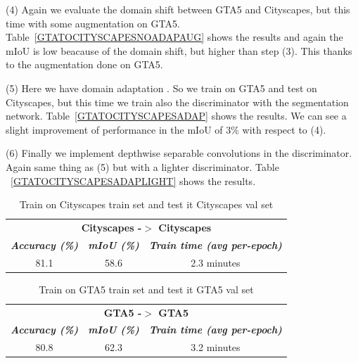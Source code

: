 \documentclass[conference]{IEEEtran}
\begin{document}
(4) Again we evaluate the domain shift between GTA5 and Cityscapes, but this time with some augmentation on GTA5. Table~\ref{GTATOCITYSCAPESNOADAPAUG}
shows the results and again the mIoU is low beacause of the domain shift, but higher than step (3). This thanks to the augmentation 
done on GTA5.

(5) Here we have domain adaptation \cite{b3}. So we train on GTA5 and test on Cityscapes, but this time we train also the discriminator
with the segmentation network. Table~\ref{GTATOCITYSCAPESADAP} shows the results. We can see a slight improvement of performance
in the mIoU of 3\% with respect to (4).

(6) Finally we implement depthwise separable convolutions in the discriminator. Again same thing as (5) but with a lighter discriminator. Table
~\ref{GTATOCITYSCAPESADAPLIGHT} shows the results. 



\begin{table}[tb]
\caption{Train on Cityscapes train set and test it Cityscapes val set}
\begin{center}
\begin{tabular}{|c|c|c|}
\hline
\multicolumn{3}{|c|}{\textbf{Cityscapes -$>$ Cityscapes}} \\
\cline{1-3} 
\textbf{\textit{Accuracy (\%)}}& \textbf{\textit{mIoU (\%)}}& \textbf{\textit{Train time (avg per-epoch)}} \\
\hline
81.1& 58.6& 2.3 minutes   \\
\hline
\end{tabular}
\label{CityscapesToCityscapes}
\end{center}
\end{table}

\begin{table}[tb]
\caption{Train on GTA5 train set and test it GTA5 val set}
\begin{center}
\begin{tabular}{|c|c|c|}
\hline
\multicolumn{3}{|c|}{\textbf{GTA5 -$>$ GTA5}} \\
\cline{1-3} 
\textbf{\textit{Accuracy (\%)}}& \textbf{\textit{mIoU (\%)}}& \textbf{\textit{Train time (avg per-epoch)}} \\
\hline
80.8& 62.3& 3.2 minutes   \\
\hline
\end{tabular}
\label{GTATOGTA}
\end{center}
\end{table}
\end{document}
